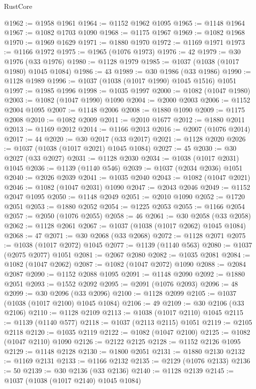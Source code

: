 \begin{lexlean}{RustCore}
\begin{coremodule}
@1962 := @1958 @1961
@1964 := @1152 @1962 @1095
@1965 := @1148 @1964
@1967 := @1082 @1703 @1090
@1968 := @1175 @1967
@1969 := @1082 @1968
@1970 := @1969 @1629
@1971 := @1880 @1970
@1972 := @1169 @1971
@1973 := @1166 @1972
@1975 := @1965 (@1076 @1973)
@1976 := 42
@1979 := @30 @1976 (@33 @1976)
@1980 := @1128 @1979
@1985 := @1037 (@1038 (@1017 @1980) @1045 @1084)
@1986 := 43
@1989 := @30 @1986 (@33 @1986)
@1990 := @1128 @1989
@1996 := @1037 (@1038 (@1017 @1990) @1045 @1516) @1051
@1997 := @1985 @1996
@1998 := @1035 @1997
@2000 := @1082 (@1047 @1980)
@2003 := @1082 (@1047 @1990) @1090
@2004 := @2000 @2003
@2006 := @1152 @2004 @1095
@2007 := @1148 @2006
@2008 := @1880 @1090
@2009 := @1175 @2008
@2010 := @1082 @2009
@2011 := @2010 @1677
@2012 := @1880 @2011
@2013 := @1169 @2012
@2014 := @1166 @2013
@2016 := @2007 (@1076 @2014)
@2017 := 44
@2020 := @30 @2017 (@33 @2017)
@2021 := @1128 @2020
@2026 := @1037 (@1038 (@1017 @2021) @1045 @1084)
@2027 := 45
@2030 := @30 @2027 (@33 @2027)
@2031 := @1128 @2030
@2034 := @1038 (@1017 @2031) @1045
@2036 := @1139 (@1140 @546)
@2039 := @1037 (@2034 @2036) @1051
@2040 := @2026 @2039
@2041 := @1035 @2040
@2043 := @1082 (@1047 @2021)
@2046 := @1082 (@1047 @2031) @1090
@2047 := @2043 @2046
@2049 := @1152 @2047 @1095
@2050 := @1148 @2049
@2051 := @2010 @1090
@2052 := @1720 @2051
@2053 := @1880 @2052
@2054 := @1225 @2053
@2055 := @1166 @2054
@2057 := @2050 (@1076 @2055)
@2058 := 46
@2061 := @30 @2058 (@33 @2058)
@2062 := @1128 @2061
@2067 := @1037 (@1038 (@1017 @2062) @1045 @1084)
@2068 := 47
@2071 := @30 @2068 (@33 @2068)
@2072 := @1128 @2071
@2075 := @1038 (@1017 @2072) @1045
@2077 := @1139 (@1140 @563)
@2080 := @1037 (@2075 @2077) @1051
@2081 := @2067 @2080
@2082 := @1035 @2081
@2084 := @1082 (@1047 @2062)
@2087 := @1082 (@1047 @2072) @1090
@2088 := @2084 @2087
@2090 := @1152 @2088 @1095
@2091 := @1148 @2090
@2092 := @1880 @2051
@2093 := @1552 @2092
@2095 := @2091 (@1076 @2093)
@2096 := 48
@2099 := @30 @2096 (@33 @2096)
@2100 := @1128 @2099
@2105 := @1037 (@1038 (@1017 @2100) @1045 @1084)
@2106 := 49
@2109 := @30 @2106 (@33 @2106)
@2110 := @1128 @2109
@2113 := @1038 (@1017 @2110) @1045
@2115 := @1139 (@1140 @577)
@2118 := @1037 (@2113 @2115) @1051
@2119 := @2105 @2118
@2120 := @1035 @2119
@2122 := @1082 (@1047 @2100)
@2125 := @1082 (@1047 @2110) @1090
@2126 := @2122 @2125
@2128 := @1152 @2126 @1095
@2129 := @1148 @2128
@2130 := @1800 @2051
@2131 := @1880 @2130
@2132 := @1169 @2131
@2133 := @1166 @2132
@2135 := @2129 (@1076 @2133)
@2136 := 50
@2139 := @30 @2136 (@33 @2136)
@2140 := @1128 @2139
@2145 := @1037 (@1038 (@1017 @2140) @1045 @1084)

\end{coremodule}
\end{lexlean}
